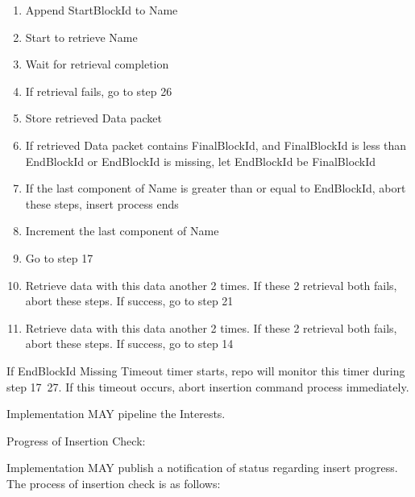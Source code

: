 \documentclass{acm_proc_article-sp}
\begin{document}
\begin{enumerate}[step 1]
\item Append StartBlockId to Name

\item Start to retrieve Name

\item Wait for retrieval completion

\item If retrieval fails, go to step 26

\item Store retrieved Data packet

\item If retrieved Data packet contains FinalBlockId, and FinalBlockId is less than EndBlockId or EndBlockId is missing, let EndBlockId be FinalBlockId

\item If the last component of Name is greater than or equal to EndBlockId, abort these steps, insert process ends

\item Increment the last component of Name

\item Go to step 17

\item Retrieve data with this data another 2 times. If these 2 retrieval both fails, abort these steps. If success, go to step 21

\item Retrieve data with this data another 2 times. If these 2 retrieval both fails, abort these steps. If success, go to step 14
\end{enumerate}

If EndBlockId Missing Timeout timer starts, repo will monitor this timer during step 17~27. If this timeout occurs, abort insertion command process immediately.

Implementation MAY pipeline the Interests.

Progress of Insertion Check:

Implementation MAY publish a notification of status regarding insert progress. The process of insertion check is as follows:
\end{document}
